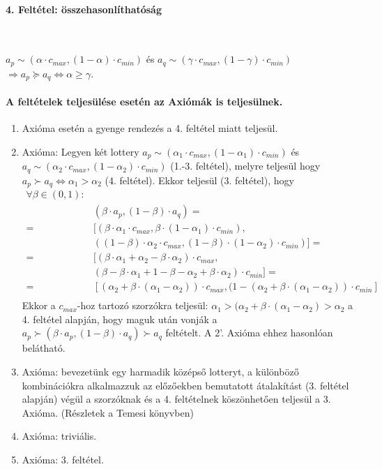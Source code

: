 \documentclass[a4paper,12pt]{article}
\begin{document}
\paragraph{4. Feltétel: összehasonlíthatóság}

\

$a_p \sim (\alpha \cdot c_{max}, (1-\alpha) \cdot c_{min})$ és 
$a_q \sim (\gamma \cdot c_{max}, (1-\gamma) \cdot c_{min})$ $\Rightarrow a_p \succeq a_q \Leftrightarrow \alpha \geq \gamma$. 

\paragraph{A feltételek teljesülése esetén az Axiómák is teljesülnek.}

\begin{enumerate}
\item Axióma esetén a gyenge rendezés a 4. feltétel miatt teljesül.
\item Axióma: Legyen két lottery $a_p \sim (\alpha_1 \cdot c_{max}, (1-\alpha_1 )\cdot c_{min})$ és 
$a_q \sim (\alpha_2 \cdot c_{max}, (1-\alpha_2 )\cdot c_{min})$ (1.-3. feltétel), melyre teljesül hogy $a_p \succ a_q \Leftrightarrow \alpha_1  > \alpha_2 $ (4. feltétel). Ekkor teljesül (3. feltétel), hogy
\begin{equation}
\begin{split}
\forall \beta \in (0,1):& \\
& (\beta\cdot a_p, (1-\beta)\cdot a_q) = \\ 
= & [(\beta\cdot \alpha_1 \cdot c_{max}, \beta\cdot (1-\alpha_1 )\cdot c_{min}), \\
& ((1-\beta)\cdot \alpha_2 \cdot c_{max}, (1-\beta)\cdot (1-\alpha_2 )\cdot c_{min})] = \\
= & [(\beta\cdot \alpha_1  + \alpha_2 -\beta\cdot \alpha_2  )\cdot c_{max},\\
& (\beta-\beta\cdot \alpha_1  + 1-\beta-\alpha_2 +\beta\cdot \alpha_2 )\cdot c_{min}] = \\ 
= & [(\alpha_2  + \beta\cdot (\alpha_1  - \alpha_2  ))\cdot c_{max},(1 - (\alpha_2  + \beta\cdot (\alpha_1  - \alpha_2  ))\cdot c_{min}] \\
\end{split}
\end{equation} 
Ekkor a $c_{max}$-hoz tartozó szorzókra teljesül: $\alpha_1  >(\alpha_2  + \beta\cdot (\alpha_1  - \alpha_2 ) > \alpha_2 $ a 4. feltétel alapján, hogy maguk után vonják a $a_p \succ (\beta\cdot a_p , (1-\beta)\cdot a_q ) \succ a_q$ feltételt. A 2'. Axióma ehhez hasonlóan belátható.
\item Axióma: bevezetünk egy harmadik középső lotteryt, a különböző kombinációkra alkalmazzuk az előzőekben bemutatott átalakítást (3. feltétel alapján) végül a szorzóknak és a 4. feltételnek köszönhetően teljesül a 3. Axióma. (Részletek a Temesi könyvben) 
\item Axióma: triviális.
\item Axióma: 3. feltétel.
\end{enumerate}
\end{document}
